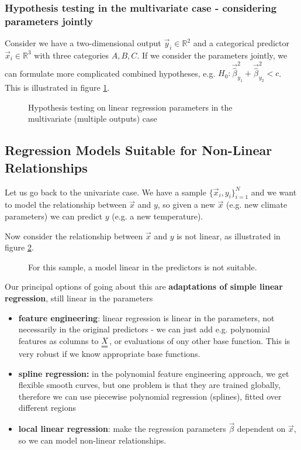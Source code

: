 \subsubsection{Hypothesis testing in the multivariate case - considering parameters jointly}
Consider we have a two-dimensional output $\vec{y}_i \in \mathbb{R}^2$ and a categorical
predictor $\vec{x}_i \in \mathbb{R}^3$ with three categories $A,B,C$. If we consider the parameters
jointly, we can formulate more complicated combined hypotheses, e.g. $H_0: \vec{\hat{\beta}}_{y_1}^2 + \vec{\hat{\beta}}_{y_2}^2 < c$.
This is illustrated in figure \ref{fig:multivariate_hypothesis}.

\begin{figure}[!htb]
 \centering
 \hfill
 \caption{Hypothesis testing on linear regression parameters in the multivariate (multiple outputs) case}
 \label{fig:multivariate_hypothesis}
\end{figure}

\subsection{Regression Models Suitable for Non-Linear Relationships}
Let us go back to the univariate case. We have a sample $\{\vec{x}_i,y_i\}_{i=1}^N$ and we want to model
the relationship between $\vec{x}$ and $y$, so given a new $\vec{x}$ (e.g. new climate 
parameters) we can predict $y$ (e.g. a new temperature).

Now consider the relationship between $\vec{x}$ and $y$ is not linear, as illustrated
in figure \ref{fig:nonlinear_relationship}.

\begin{figure}[!htb]
 \centering
 \hfill
 \caption{For this sample, a model linear in the predictors is not suitable.}
 \label{fig:nonlinear_relationship}
\end{figure}

Our principal options of going about this are \textbf{adaptations of simple linear regression}, still
linear in the parameters

\begin{itemize}
    \item \textbf{feature engineering}: linear regression is linear in the parameters, not necessarily in the original predictors - we can just add e.g. polynomial features as columns to $\mat{X}$, or evaluations of ony other base function. This is \textcolor{green1}{very robust} \textcolor{red1}{if we know appropriate base functions.}
    \item \textbf{spline regression:} in the polynomial feature engineering approach, we get flexible smooth curves, but one problem is that they are trained globally, therefore we can use piecewise polynomial regression (splines), fitted over different regions
    \item \textbf{local linear regression}: make the regression parameters $\vec{\beta}$ dependent on $\vec{x}$, so we can model non-linear relationships.
\end{itemize}

